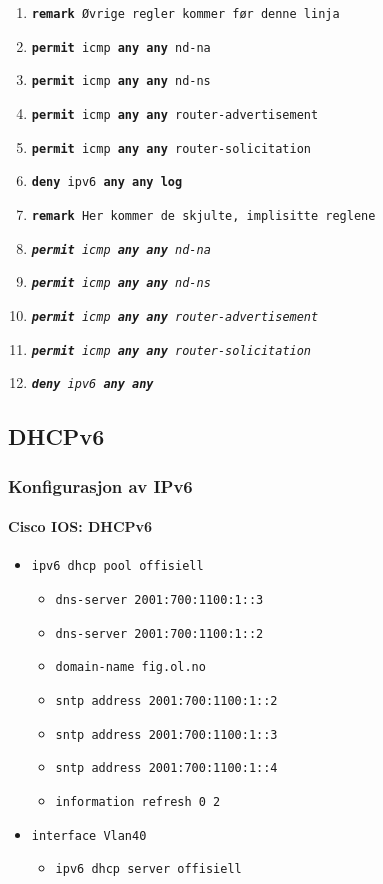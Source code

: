 \begin{frame}[allowframebreaks]
\begin{itemize}
\begin{enumerate}
    \item \texttt{\textbf{remark} Øvrige regler kommer før denne linja}
    \item \texttt{\textbf{permit} icmp \textbf{any any} nd-na}
    \item \texttt{\textbf{permit} icmp \textbf{any any} nd-ns}
    \item \texttt{\textbf{permit} icmp \textbf{any any} router-advertisement}
    \item \texttt{\textbf{permit} icmp \textbf{any any} router-solicitation}
    \item \texttt{\textbf{deny\phantom{it}} ipv6 \textbf{any any \alert{log}}}
    \item \texttt{\textbf{remark} Her kommer de skjulte, implisitte reglene}
    \item \texttt{\textit{\textbf{permit} icmp \textbf{any} \textbf{any} nd-na}}
    \item \texttt{\textit{\textbf{permit} icmp \textbf{any} \textbf{any} nd-ns}}
    \item \texttt{\textit{\textbf{permit} icmp \textbf{any} \textbf{any} router-advertisement}}
    \item \texttt{\textit{\textbf{permit} icmp \textbf{any} \textbf{any} router-solicitation}}
    \item \texttt{\textit{\textbf{deny\phantom{it}} ipv6 \textbf{any} \textbf{any}}}
    \end{enumerate}
  \end{itemize}
\end{frame}

\subsection{DHCPv6}
\begin{frame}%
  \frametitle{Konfigurasjon av IPv6}
  \framesubtitle{Cisco IOS: DHCPv6}
  \pause
  \begin{itemize}[<+->]
  \item \texttt{ipv6 dhcp pool offisiell}
    \begin{itemize}[<+->]
    \item \texttt{dns-server 2001:700:1100:1::3}
    \item \texttt{dns-server 2001:700:1100:1::2}
    \item \texttt{domain-name fig.ol.no}
    \item \texttt{sntp address 2001:700:1100:1::2}
    \item \texttt{sntp address 2001:700:1100:1::3}
    \item \texttt{sntp address 2001:700:1100:1::4}
    \item \texttt{information refresh 0 2}
    \end{itemize}
  \item \texttt{interface Vlan40}
    \begin{itemize}[<+->]
    \item \texttt{ipv6 dhcp server offisiell}
    \end{itemize}
  \end{itemize}
\end{frame}

